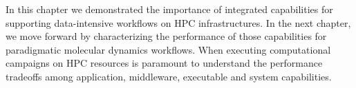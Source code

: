 In this chapter we demonstrated the importance of integrated capabilities for
supporting data-intensive workflows on HPC infrastructures. In the next chapter,
we move forward by characterizing the performance of those capabilities for
paradigmatic molecular dynamics workflows. When executing computational
campaigns on HPC resources is paramount to understand the performance tradeoffs
among application, middleware, executable and system capabilities.

%
%
%
